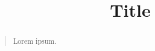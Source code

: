 \documentclass[letterpaper]{article}
\begin{document}
\title{Title}

\maketitle

\begin{abstract}
\begin{quote}
Lorem ipsum.
\end{quote}
\end{abstract}









\end{document}
